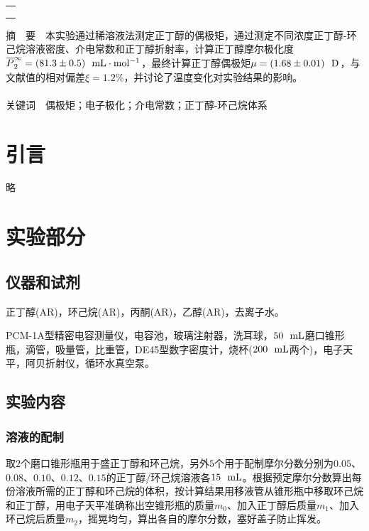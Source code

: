 \documentclass[12pt]{article}
\begin{document}
\begin{titlepage}
\begin{center}
            \begin{tabular*}{\textwidth}{c}
                \\ %
                \\ %
                \\ %
                \\ %
                \hline %
            \end{tabular*}
        \end{center}
        \textsf{摘\ \ 要}\ \ 本实验通过稀溶液法测定正丁醇的偶极矩，通过测定不同浓度正丁醇-环己烷溶液密度、介电常数和正丁醇折射率，计算正丁醇摩尔极化度$\overline{P}^{\infty}_{2}=(81.3\pm 0.5)\ \ {\rm mL\cdot mol^{-1}}$，最终计算正丁醇偶极矩$\mu=(1.68\pm 0.01)\ \ {\rm D}$，与文献值的相对偏差$\xi=1.2\%$，并讨论了温度变化对实验结果的影响。
        \\
        \\
        \textsf{关键词}\ \ 偶极矩；电子极化；介电常数；正丁醇-环己烷体系
    \end{titlepage}

    \section{引言}
	略
               
\vbox{}        
    \section{实验部分}
    	\subsection{仪器和试剂}
    	正丁醇(AR)，环己烷(AR)，丙酮(AR)，乙醇(AR)，去离子水。\par 
    	PCM-1A型精密电容测量仪，电容池，玻璃注射器，洗耳球，$\rm 50\ \ mL$磨口锥形瓶，滴管，吸量管，比重管，DE45型数字密度计，烧杯($\rm 200\ \ mL$两个)，电子天平，阿贝折射仪，循环水真空泵。
     
\vbox{}
    	 \subsection{实验内容\citealp{physchemlab}}
			\subsubsection{溶液的配制}
			取$2$个磨口锥形瓶用于盛正丁醇和环己烷，另外$5$个用于配制摩尔分数分别为$0.05$、$0.08$、$0.10$、$0.12$、$0.15$的正丁醇/环己烷溶液各$\rm 15\ \ mL$。根据预定摩尔分数算出每份溶液所需的正丁醇和环己烷的体积，按计算结果用移液管从锥形瓶中移取环己烷和正丁醇，用电子天平准确称出空锥形瓶的质量$m_{0}$、加入正丁醇后质量$m_{1}$、加入环己烷后质量$m_{2}$，摇晃均匀，算出各自的摩尔分数，塞好盖子防止挥发。
		
\end{document}
